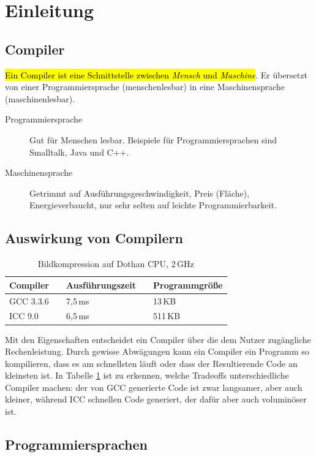 \documentclass[ngerman,abstract=true]{scrartcl}
\newcommand{\tablespacing}[1]{\renewcommand{\arraystretch}{#1}}
\begin{document}
\section{Einleitung}

\subsection{Compiler}

\hl{Ein Compiler ist eine Schnittstelle zwischen \emph{Mensch} und \emph{Maschine}}. Er übersetzt von einer Programmiersprache (menschenlesbar) in eine Maschinensprache (maschinenlesbar).

\begin{description}
  \item[Programmiersprache] Gut für Menschen lesbar. Beispiele für Programmiersprachen sind Smalltalk, Java und C++.
  \item[Maschinensprache] Getrimmt auf Ausführungsgeschwindigkeit, Preis (Fläche), Energieverbaucht, nur sehr selten auf leichte Programmierbarkeit.
\end{description}

\subsection{Auswirkung von Compilern}
\begin{table}[h]
\centering
\tablespacing{1.2}
\begin{tabular}{@{}lp{.5cm}lp{.5cm}l@{}}
  \toprule
    Compiler && Ausführungszeit && Programmgröße\\
    \midrule
      GCC 3.3.6 && 7,5\,ms && 13\,KB\\
      ICC 9.0 && 6,5\,ms && 511\,KB\\
    \bottomrule
\end{tabular}
\caption{Bildkompression auf Dothan CPU, 2\,GHz}\label{fig:compilerspeed}
\end{table}
\noindent
Mit den Eigenschaften entscheidet ein Compiler über die dem Nutzer zugängliche Rechenleistung. Durch gewisse Abwägungen kann ein Compiler ein Programm so kompilieren, dass es am schnellsten läuft oder dass der Resultierende Code an kleinsten ist.
In Tabelle \ref{fig:compilerspeed} ist zu erkennen, welche Tradeoffs unterschiedliche Compiler machen: der von GCC generierte Code ist zwar langsamer, aber auch kleiner, während ICC schnellen Code generiert, der dafür aber auch voluminöser ist.

\subsection{Programmiersprachen}
\end{document}
